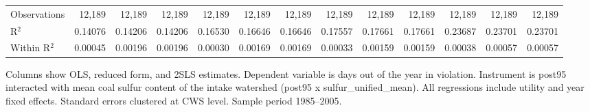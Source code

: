 \begin{table}[htbp]
\begin{adjustbox}{width = \textwidth, center}
\begin{tabular}{lrrrrrrrrrrrr}
          \\
         
         Observations                                                        & 12,189   & 12,189          & 12,189        & 12,189   & 12,189         & 12,189        & 12,189   & 12,189         & 12,189        & 12,189   & 12,189   & 12,189\\  
         R$^2$                                                               & 0.14076  & 0.14206         & 0.14206       & 0.16530  & 0.16646        & 0.16646       & 0.17557  & 0.17661        & 0.17661       & 0.23687  & 0.23701  & 0.23701\\  
         Within R$^2$                                                        & 0.00045  & 0.00196         & 0.00196       & 0.00030  & 0.00169        & 0.00169       & 0.00033  & 0.00159        & 0.00159       & 0.00038  & 0.00057  & 0.00057\\  
         
         \bottomrule
         
      \end{tabular}
      
      
      
   \end{adjustbox}
      {\tiny\linespread{1}\selectfont \par \raggedright 
   Columns show OLS, reduced form, and 2SLS estimates. Dependent variable is days out of the year in violation. Instrument is post95 interacted with mean coal sulfur content of the intake watershed (post95 x sulfur\_unified\_mean). All regressions include utility and year fixed effects. Standard errors clustered at CWS level. Sample period 1985--2005.}
   
\end{table}


